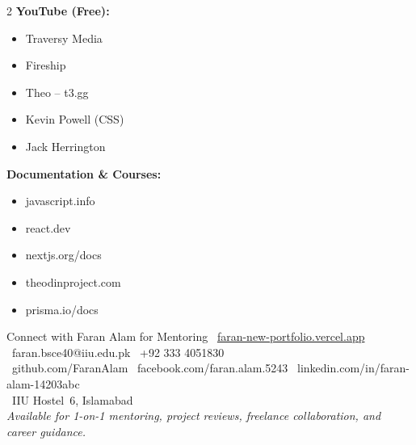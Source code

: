 \documentclass[12pt,a4paper]{article}
\begin{document}
\begin{multicols}{2}
\textbf{\color{FaranPurple}YouTube (Free):}
\begin{itemize}[leftmargin=1.2em, itemsep=3pt]
    \item[\faYoutube] Traversy Media
    \item[\faYoutube] Fireship
    \item[\faYoutube] Theo -- t3.gg
    \item[\faYoutube] Kevin Powell (CSS)
    \item[\faYoutube] Jack Herrington
\end{itemize}

\columnbreak

\textbf{\color{FaranPurple}Documentation \& Courses:}
\begin{itemize}[leftmargin=1.2em, itemsep=3pt]
    \item[\faBook] javascript.info
    \item[\faBook] react.dev
    \item[\faBook] nextjs.org/docs
    \item[\faBook] theodinproject.com
    \item[\faBook] prisma.io/docs
\end{itemize}
\end{multicols}

\vspace{0.5cm}
\begin{infobox}{Connect with Faran Alam for Mentoring}
\faGlobe\ \href{https://faran-new-portfolio.vercel.app/}{faran-new-portfolio.vercel.app} \quad
\faEnvelope\ faran.bsce40@iiu.edu.pk \quad \faWhatsapp\ +92 333 4051830\\[0.15cm]
\faGithub\ github.com/FaranAlam \quad \faFacebook\ facebook.com/faran.alam.5243 \quad \faLinkedin\ linkedin.com/in/faran-alam-14203abc\\[0.15cm]
\faMapMarkerAlt\ IIU Hostel~6, Islamabad\\[0.1cm]
\textit{Available for 1-on-1 mentoring, project reviews, freelance collaboration, and career guidance.}
\end{infobox}
\end{document}
